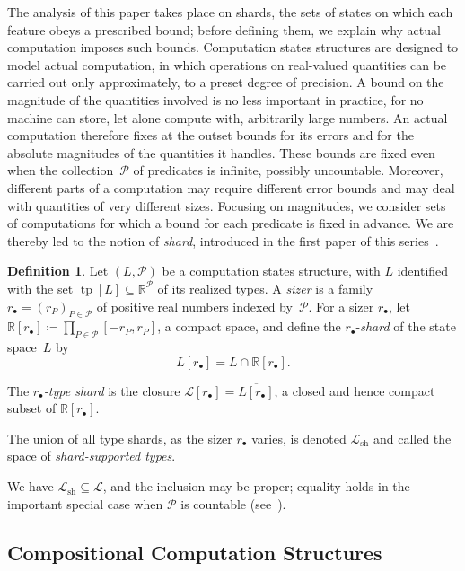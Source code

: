 \documentclass[psamsfonts]{amsart}
\theoremstyle{definition}
\newtheorem{defn}[thm]{Definition}
\theoremstyle{remark}
\DeclareMathOperator{\tp}{tp}
\newcommand{\sh}{\text{sh}}
\newcommand{\rb}{r_{\bullet}}
\numberwithin{equation}{section}
\begin{document}
The analysis of this paper takes place on shards, the sets of states on which each feature obeys a prescribed bound;
before defining them, we explain why actual computation imposes such bounds.
Computation states structures are designed to model actual computation, in which operations on real-valued quantities can be carried out only approximately, to a preset degree of precision.
A bound on the magnitude of the quantities involved is no less important in practice, for no machine can store, let alone compute with, arbitrarily large numbers.
An actual computation therefore fixes at the outset bounds for its errors and for the absolute magnitudes of the quantities it handles.
These bounds are fixed even when the collection~$\mathcal{P}$ of predicates is infinite, possibly uncountable.
Moreover, different parts of a computation may require different error bounds and may deal with quantities of very different sizes.
Focusing on magnitudes, we consider sets of computations for which a bound for each predicate is fixed in advance.
We are thereby led to the notion of \emph{shard}, introduced in the first paper of this series~\cite{alva2024approximability}.

\begin{defn}
  Let $(L, \mathcal{P})$ be a computation states structure, with $L$ identified with the set $\tp[L]\subseteq \mathbb{R}^{\mathcal{P}}$ of its realized types.
  A \emph{sizer} is a family $r_{\bullet}=(r_P)_{P\in\mathcal{P}}$ of positive real numbers indexed by~$\mathcal{P}$.
  For a sizer $r_\bullet$, let $\mathbb{R}[\rb] \coloneqq \prod_{P\in\mathcal{P}}[-r_P,r_P]$, a compact space, and define the $r_\bullet$-\emph{shard} of the state space~$L$ by
  \[
    L[r_\bullet] = L\cap \mathbb{R}[\rb].
  \]

  The \emph{$r_{\bullet}$-type shard} is the closure $\mathcal{L}[r_\bullet]=\overline{L[r_\bullet]}$, a closed and hence compact subset of $\mathbb{R}[\rb]$.

  The union of all type shards, as the sizer $r_{\bullet}$ varies, is denoted $\mathcal{L}_{\sh}$ and called the space of \emph{shard-supported types}.
\end{defn}

We have $\mathcal{L}_{\sh}\subseteq \mathcal{L}$, and the inclusion may be proper;
equality holds in the important special case when $\mathcal{P}$ is countable (see~\cite{alva2024approximability}).

\subsection{Compositional Computation Structures}
\end{document}
